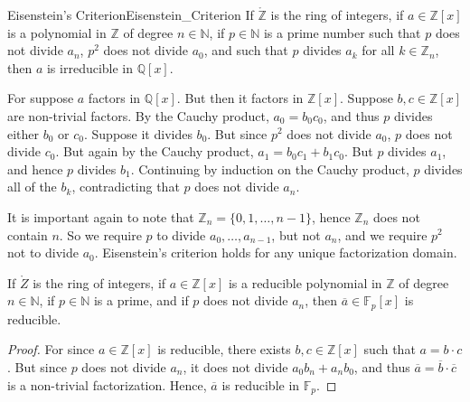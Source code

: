 \documentclass{article}                                                        %
\begin{document}
        \begin{ftheorem}{Eisenstein's Criterion}{Eisenstein_Criterion}
            If $\ring{\mathbb{Z}}$ is the ring of integers, if
            $a\in\mathbb{Z}[x]$ is a polynomial in $\mathbb{Z}$ of degree
            $n\in\mathbb{N}$, if $p\in\mathbb{N}$ is a prime number such that
            $p$ does not divide $a_{n}$, $p^{2}$ does not divide $a_{0}$, and
            such that $p$ divides $a_{k}$ for all $k\in\mathbb{Z}_{n}$, then $a$
            is irreducible in $\mathbb{Q}[x]$.
        \end{ftheorem}
        \begin{bproof}
            For suppose $a$ factors in $\mathbb{Q}[x]$. But then it factors in
            $\mathbb{Z}[x]$. Suppose $b,c\in\mathbb{Z}[x]$ are non-trivial
            factors. By the Cauchy product, $a_{0}=b_{0}c_{0}$, and thus
            $p$ divides either $b_{0}$ or $c_{0}$. Suppose it divides $b_{0}$.
            But since $p^{2}$ does not divide $a_{0}$, $p$ does not divide
            $c_{0}$. But again by the Cauchy product,
            $a_{1}=b_{0}c_{1}+b_{1}c_{0}$. But $p$ divides $a_{1}$, and hence
            $p$ divides $b_{1}$. Continuing by induction on the Cauchy product,
            $p$ divides all of the $b_{k}$, contradicting that $p$ does not
            divide $a_{n}$.
        \end{bproof}
        It is important again to note that $\mathbb{Z}_{n}=\{0,1,\dots,n-1\}$,
        hence $\mathbb{Z}_{n}$ does not contain $n$. So we require $p$ to divide
        $a_{0},\dots,a_{n-1}$, but not $a_{n}$, and we require $p^{2}$ not to
        divide $a_{0}$. Eisenstein's criterion holds for any unique
        factorization domain.
        \begin{theorem}
            If $\ring{Z}$ is the ring of integers, if $a\in\mathbb{Z}[x]$ is a
            reducible polynomial in $\mathbb{Z}$ of degree $n\in\mathbb{N}$, if
            $p\in\mathbb{N}$ is a prime, and if $p$ does not divide $a_{n}$,
            then $\overline{a}\in\mathbb{F}_{p}[x]$ is reducible.
        \end{theorem}
        \begin{proof}
            For since $a\in\mathbb{Z}[x]$ is reducible, there exists
            $b,c\in\mathbb{Z}[x]$ such that $a=b\cdot{c}$. But since
            $p$ does not divide $a_{n}$, it does not divide
            $a_{0}b_{n}+a_{n}b_{0}$, and thus
            $\overline{a}=\overline{b}\cdot\overline{c}$ is a non-trivial
            factorization. Hence, $\overline{a}$ is reducible in
            $\mathbb{F}_{p}$.
        \end{proof}
\end{document}
